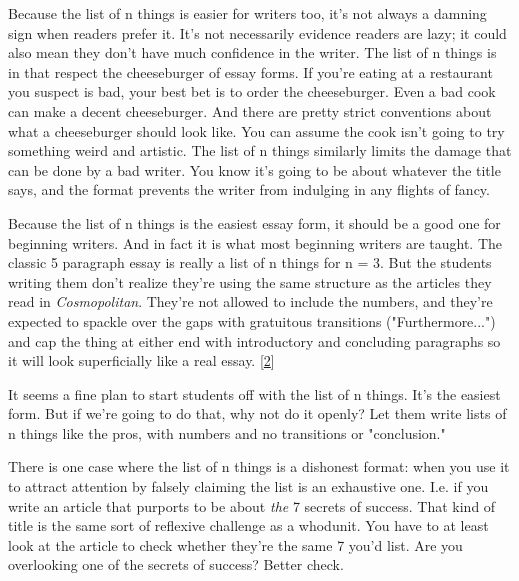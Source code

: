 Because the list of n things is easier
                  for writers too, it's not always a damning sign when readers
                  prefer it. It's not necessarily evidence readers are lazy; it
                  could also mean they don't have much confidence in the writer.
                  The list of n things is in that respect the cheeseburger of
                  essay forms. If you're eating at a restaurant you suspect is
                  bad, your best bet is to order the cheeseburger. Even a bad
                  cook can make a decent cheeseburger. And there are pretty
                  strict conventions about what a cheeseburger should look like.
                  You can assume the cook isn't going to try something weird and
                  artistic. The list of n things similarly limits the damage
                  that can be done by a bad writer. You know it's going to be
                  about whatever the title says, and the format prevents the
                  writer from indulging in any flights of fancy.

Because
                  the list of n things is the easiest essay form, it should be a
                  good one for beginning writers. And in fact it is what most
                  beginning writers are taught. The classic 5 paragraph essay is
                  really a list of n things for n = 3. But the students writing
                  them don't realize they're using the same structure as the
                  articles they read in \emph{Cosmopolitan}. They're not allowed
                  to include the numbers, and they're expected to spackle over
                  the gaps with gratuitous transitions ("Furthermore...") and
                  cap the thing at either end with introductory and concluding
                  paragraphs so it will look superficially like a real essay.
                  [\href{\#f2n}{2}]

It seems a fine plan to start students off with
                  the list of n things. It's the easiest form. But if we're
                  going to do that, why not do it openly? Let them write lists
                  of n things like the pros, with numbers and no transitions or
                  "conclusion."

There is one case where the list of n
                  things is a dishonest format: when you use it to attract
                  attention by falsely claiming the list is an exhaustive one.
                  I.e. if you write an article that purports to be about
                  \emph{the} 7 secrets of success. That kind of title is the
                  same sort of reflexive challenge as a whodunit. You have to at
                  least look at the article to check whether they're the same 7
                  you'd list. Are you overlooking one of the secrets of success?
                  Better check.

